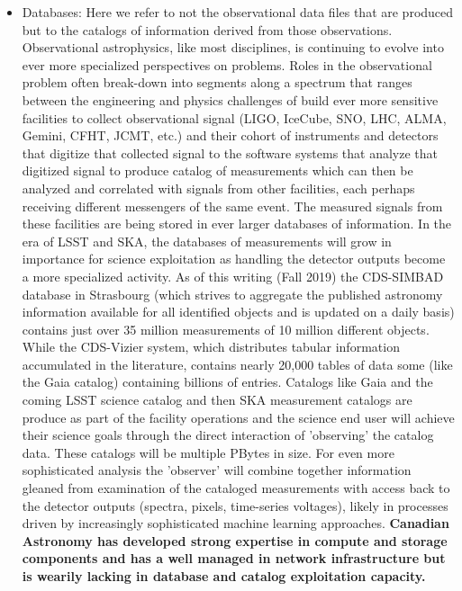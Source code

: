 \documentclass[11pt]{article}
\begin{document}
\begin{itemize}
    \item Databases: Here we refer to not the observational data files that are produced but to the catalogs of information derived from those observations.  Observational astrophysics, like most disciplines, is continuing to evolve into ever more specialized perspectives on problems. Roles in the observational problem often break-down into segments along a spectrum that ranges between the engineering and physics challenges of build ever more sensitive facilities to collect observational signal (LIGO, IceCube, SNO, LHC, ALMA, Gemini, CFHT, JCMT, etc.) and their cohort of instruments and detectors that digitize that collected signal to the software systems that analyze that digitized signal to produce catalog of measurements which can then be analyzed and correlated with signals from other facilities, each perhaps receiving different messengers of the same event. The measured signals from these facilities are being stored in ever larger databases of information. 
     In the era of LSST and SKA, the databases of measurements will grow in importance for science exploitation as handling the detector outputs become a more specialized activity.
    As of this writing (Fall 2019) the CDS-SIMBAD database in Strasbourg (which strives to aggregate the published astronomy information available for all identified objects and is updated on a daily basis) contains just over 35 million measurements of 10 million different objects.  While the CDS-Vizier system, which distributes tabular information accumulated in the literature, contains nearly 20,000 tables of data some (like the Gaia catalog) containing billions of entries.  Catalogs like Gaia and the coming LSST science catalog and then SKA measurement catalogs are produce as part of the facility operations and the science end user will achieve their science goals through the direct interaction of 'observing' the catalog data.  These catalogs will be multiple PBytes in size.  For even more sophisticated analysis the 'observer' will combine together information gleaned from examination of the cataloged measurements with access back to the detector outputs (spectra, pixels, time-series voltages), likely in processes driven by increasingly sophisticated machine learning approaches.  {\bf Canadian Astronomy has developed strong expertise in compute and storage components and has a well managed in network infrastructure but is wearily lacking in database and catalog exploitation capacity. } 

\end{itemize}
\end{document}
